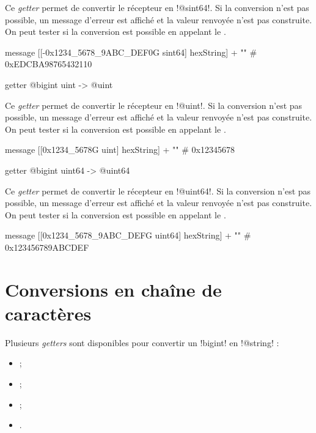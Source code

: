 Ce \emph{getter} permet de convertir le récepteur en \ggs!@sint64!. Si la conversion n'est pas possible, un message d'erreur est affiché et la valeur renvoyée n'est pas construite. On peut tester si la conversion est possible en appelant le .

\begin{galgas}
message [[-0x1234_5678_9ABC_DEF0G sint64] hexString] + "\n" # 0xEDCBA98765432110
\end{galgas}



\begin{galgasbox}
getter @bigint uint -> @uint
\end{galgasbox}

Ce \emph{getter} permet de convertir le récepteur en \ggs!@uint!. Si la conversion n'est pas possible, un message d'erreur est affiché et la valeur renvoyée n'est pas construite. On peut tester si la conversion est possible en appelant le .

\begin{galgas}
message [[0x1234_5678G uint] hexString] + "\n" # 0x12345678
\end{galgas}



\begin{galgasbox}
getter @bigint uint64 -> @uint64
\end{galgasbox}

Ce \emph{getter} permet de convertir le récepteur en \ggs!@uint64!. Si la conversion n'est pas possible, un message d'erreur est affiché et la valeur renvoyée n'est pas construite. On peut tester si la conversion est possible en appelant le .

\begin{galgas}
message [[0x1234_5678_9ABC_DEFG uint64] hexString] + "\n" # 0x123456789ABCDEF
\end{galgas}







\section{Conversions en chaîne de caractères}

Plusieurs \emph{getters} sont disponibles pour convertir un \ggs!bigint! en \ggs!@string! :
\begin{itemize}
  \item {} ;
  \item {} ;
  \item {} ;
  \item {}.
\end{itemize}

